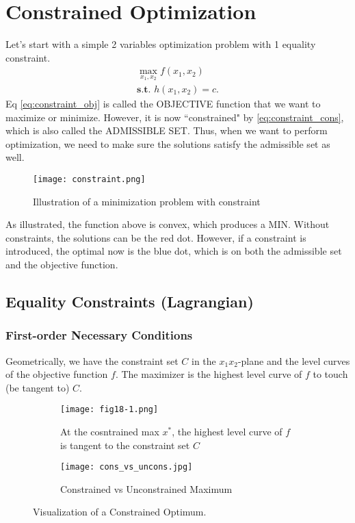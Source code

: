 \documentclass[10pt,a4paper]{book}
\theoremstyle{definition}\newtheorem{definition}{Definition}
\theoremstyle{definition}\newtheorem{fact}{Fact}
\theoremstyle{definition}\newtheorem{ex}{Ex.}
\theoremstyle{definition}\newtheorem{project}{Project}
\theoremstyle{definition}\newtheorem{problem}{Problem}
\theoremstyle{definition}\newtheorem{example}{Example}
\numberwithin{theorem}{chapter}
\numberwithin{corollary}{chapter}
\numberwithin{assumption}{chapter}
\numberwithin{definition}{chapter}
\numberwithin{prop}{chapter}
\numberwithin{notation}{chapter}
\numberwithin{problem}{chapter}
\numberwithin{example}{chapter}
\numberwithin{fact}{chapter}
\numberwithin{ex}{chapter}
\begin{document}
	
	\chapter{Constrained Optimization}
	Let's start with a simple 2 variables optimization problem with 1 equality constraint.
	\begin{align}
		\max_{x_1, x_2}  f(x_1, x_2)    \label{eq:constraint_obj}  \\
		\textbf{s.t. }  h (x_1, x_2) = c. \label{eq:constraint_cons}
	\end{align}
	Eq \eqref{eq:constraint_obj} is called the OBJECTIVE function that we want to maximize or minimize. However, it is now ``constrained" by \eqref{eq:constraint_cons}, which is also called the ADMISSIBLE SET. Thus, when we want to perform optimization, we need to make sure the solutions satisfy the admissible set as well.
	
	\begin{figure}[ht]
		\centering
		\texttt{[image: constraint.png]}
		\caption{ Illustration of a minimization problem with constraint }
	\end{figure}
	As illustrated, the function above is convex, which produces a MIN. Without constraints, the solutions can be the red dot. However, if a constraint is introduced, the optimal now is the blue dot, which is on both the admissible set and the objective function.
	
	\section{Equality Constraints (Lagrangian)}
	\subsection{First-order Necessary Conditions}
	Geometrically, we have the constraint set $C$ in the $x_1 x_2$-plane and the level curves of the objective function $f$. The maximizer is the highest level curve of $f$ to touch (be tangent to) $C$.
	
	
	\begin{figure}[h!]
		\centering
		\begin{subfigure}[b]{0.4\linewidth}
			\texttt{[image: fig18-1.png]}
			\caption{At the cosntrained max $x^*$, the highest level curve of $f$ is tangent to the constraint set $C$}
		\end{subfigure}
		\begin{subfigure}[b]{0.55\linewidth}
			\texttt{[image: cons\_vs\_uncons.jpg]}
			\caption{Constrained vs Unconstrained Maximum}
		\end{subfigure}
		\caption{Visualization of a Constrained Optimum.}
	\end{figure}
	
\end{document}
